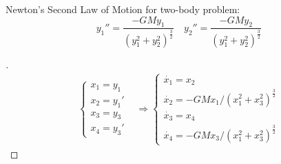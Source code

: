 \documentclass[12pt]{article}
\newenvironment{exercise}[2][Exercise]{\begin{trivlist}
\item[\hskip \labelsep {\bfseries #1}\hskip \labelsep {\bfseries #2.}]}{\end{trivlist}}
\begin{document}
\vspace{10mm}
\begin{exercise}{3}
	Newton's Second Law of Motion for two-body problem:
	\[ 	y_1'' = \frac{- G M y_1}{(y_1^2 + y_2^2)^\frac{3}{2}} \quad
		y_2'' = \frac{- G M y_2}{(y_1^2 + y_2^2)^\frac{3}{2}} \] 
\end{exercise} \vspace{-10mm}
\begin{proof}[]
	\begin{align*}
		\begin{cases} x_1 = y_1 \\ x_2 = y_1' \\ x_3 = y_3 \\ x_4 = y_3' \end{cases}
		& \Rightarrow \boxed{\begin{cases}
		\dot{x_1} = x_2 \\
		\dot{x_2} = - G M x_1 / (x_1^2 + x_3^2)^\frac{3}{2} \\
		\dot{x_3} = x_4 \\
		\dot{x_4} = - G M x_3 / (x_1^2 + x_3^2)^\frac{3}{2}
		\end{cases}}
	\end{align*}
\end{proof}
\end{document}
